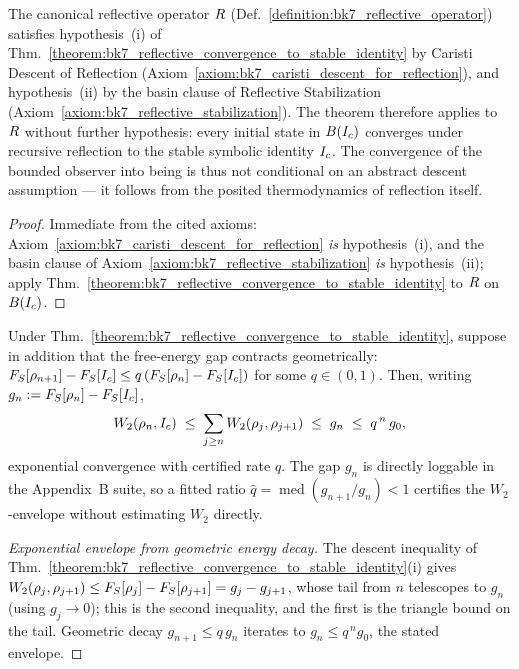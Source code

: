 \begin{corollary}
\label{corollary:bk7_observer_converges}
The canonical reflective operator \(R\) (Def.~\ref{definition:bk7_reflective_operator}) satisfies hypothesis~(i) of Thm.~\ref{theorem:bk7_reflective_convergence_to_stable_identity} by Caristi Descent of Reflection (Axiom~\ref{axiom:bk7_caristi_descent_for_reflection}), and hypothesis~(ii) by the basin clause of Reflective Stabilization (Axiom~\ref{axiom:bk7_reflective_stabilization}). The theorem therefore applies to \(R\) without further hypothesis: every initial state in \(B(I_c)\) converges under recursive reflection to the stable symbolic identity \(I_c\). The convergence of the bounded observer into being is thus not conditional on an abstract descent assumption --- it follows from the posited thermodynamics of reflection itself.
\end{corollary}
\begin{proof}
\label{proof:bk7_observer_converges}
Immediate from the cited axioms: Axiom~\ref{axiom:bk7_caristi_descent_for_reflection} \emph{is} hypothesis~(i), and the basin clause of Axiom~\ref{axiom:bk7_reflective_stabilization} \emph{is} hypothesis~(ii); apply Thm.~\ref{theorem:bk7_reflective_convergence_to_stable_identity} to \(R\) on \(B(I_c)\).
\end{proof}

\begin{corollary}
\label{corollary:bk7_geometric_convergence_rate}
Under Thm.~\ref{theorem:bk7_reflective_convergence_to_stable_identity}, suppose in addition that the free-energy gap contracts geometrically: $F_S[\rho_{n+1}] - F_S[I_c] \le q\,(F_S[\rho_n] - F_S[I_c])$ for some $q \in (0,1)$. Then, writing $g_n := F_S[\rho_n] - F_S[I_c]$,
\[
W_2(\rho_n, I_c) \;\le\; \sum_{j \ge n}W_2(\rho_j,\rho_{j+1}) \;\le\; g_n \;\le\; q^{\,n}\,g_0,
\]
exponential convergence with certified rate $q$. The gap $g_n$ is directly loggable in the Appendix~B suite, so a fitted ratio $\widehat{q} = \operatorname{med}(g_{n+1}/g_n) < 1$ certifies the $W_2$-envelope without estimating $W_2$ directly.
\end{corollary}

\begin{proof}[Exponential envelope from geometric energy decay]
\label{proof:bk7_geometric_convergence_rate}
\leavevmode
The descent inequality of Thm.~\ref{theorem:bk7_reflective_convergence_to_stable_identity}(i) gives $W_2(\rho_j,\rho_{j+1}) \le F_S[\rho_j] - F_S[\rho_{j+1}] = g_j - g_{j+1}$, whose tail from $n$ telescopes to $g_n$ (using $g_j \to 0$); this is the second inequality, and the first is the triangle bound on the tail. Geometric decay $g_{n+1} \le q\,g_n$ iterates to $g_n \le q^{\,n} g_0$, the stated envelope.
\end{proof}

